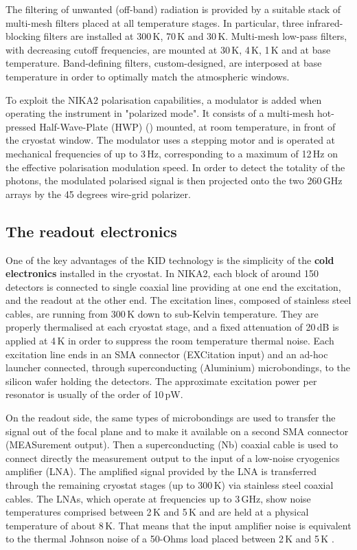 \documentclass[]{aa} %
\begin{document}
The filtering of unwanted (off-band) radiation is provided by a suitable stack of multi-mesh filters placed at all temperature stages. In particular, three infrared-blocking filters are installed at 300\,K, 70\,K and 30\,K. Multi-mesh low-pass filters, with decreasing cutoff frequencies, are mounted at 30\,K, 4\,K, 1\,K and at base temperature. Band-defining filters, custom-designed, are interposed at base temperature in order to optimally match the atmospheric windows. 

To exploit the NIKA2 polarisation capabilities, a modulator is added when operating the instrument in "polarized mode". It consists of a multi-mesh hot-pressed Half-Wave-Plate (HWP) (\cite{Pisano2016}) mounted, at room temperature, in front of the cryostat window. The modulator uses a stepping motor and is operated at mechanical frequencies of up to 3\,Hz, corresponding to a maximum of 12\,Hz on the effective polarisation modulation speed. In order to detect the totality of the photons, the modulated polarised signal is then projected onto the two 260\,GHz arrays by the 45 degrees wire-grid polarizer.  


 \subsection{The readout electronics}

One of the key advantages of the KID technology is the simplicity of the {\bf{cold electronics}} installed in the cryostat.
In NIKA2, each block of around 150 detectors is connected to single coaxial line providing at one end the excitation, and the readout at the other end. The excitation lines, composed of stainless steel cables, are running from 300\,K down to sub-Kelvin temperature. They are properly thermalised at each cryostat stage, and a fixed attenuation of 20\,dB is applied at 4\,K in order to suppress the room temperature thermal noise. Each excitation line ends in an SMA connector (EXCitation input) and an ad-hoc launcher connected, through superconducting (Aluminium) microbondings, to the silicon wafer holding the detectors. The approximate excitation power per resonator is usually of the order of 10\,pW.

On the readout side, the same types of microbondings are used to transfer the signal out of the focal plane and to make it available on a second SMA connector (MEASurement output). Then a superconducting (Nb) coaxial cable is used to connect directly the measurement output to the input of a low-noise cryogenics amplifier (LNA). The amplified signal provided by the LNA is transferred through the remaining cryostat stages (up to 300\,K) via stainless steel coaxial cables. The LNAs, which operate at frequencies up to 3\,GHz, show noise temperatures comprised between 2\,K and 5\,K and are held at a physical temperature of about 8\,K. That means that the input amplifier noise is equivalent to the thermal Johnson noise of a 50-Ohms load placed between 2\,K and 5\,K .
\end{document}
